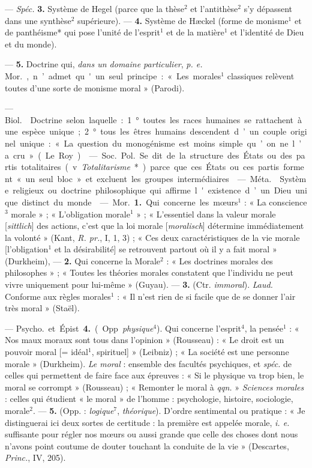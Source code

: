 \begin{itemize}[leftmargin=1cm, label=, itemsep=1pt]
— {\it Spéc.} {\bf 3.} Système de Hegel (parce que la thèse$^2$ et
l’antithèse$^2$ s'y dépassent dans une synthèse$^2$ supérieure). — {\bf 4.}
Système de Hæckel (forme de monisme$^1$ et de panthéisme* qui pose l’unité de
l'esprit$^1$ et de la matière$^1$ et l'identité de Dieu et du monde).

— {\bf 5.} Doctrine qui, {\it dans un domaine particulier}, {\it p. e.}
\si{Mor.}, n’admet qu'un seul principe : « Les morales$^1$ classiques
relèvent toutes d’une sorte de monisme moral » (Parodi).

 — \si{Biol.}  Doctrine selon laquelle : 1°
toutes les races humaines se rattachent à une espèce unique; 2° tous les
êtres humains descendent d’un couple originel unique : « La question du
monogénisme est moins simple qu’on ne l’a cru » (Le Roy).

 — \si{Soc.} \si{Pol.} Se dit de la structure des États ou
des partis totalitaires (v. {\it Totalitarisme}*) parce que ces États ou ces
partis forment « un seul bloc » et excluent les groupes intermédiaires.

 — \si{Méta.}  Système religieux ou doctrine
philosophique qui affirme l'existence d’un Dieu unique distinct du monde.

 — \si{Mor.} {\bf 1.} Qui concerne les mœurs$^1$ : « La
conscience$^3$ morale » ;
« L'obligation morale$^1$ » ; « L’essentiel dans la valeur morale
[{\it sittlich}] des actions, c’est que la loi morale [{\it moralisch}]
détermine immédiatement la volonté » (Kant, {\it R. pr.}, I, 1, 3) ; « Ces
deux caractéristiques de la vie morale [l’obligation$^1$ et la désirabilité]
se retrouvent partout où il y a fait moral » (Durkheim), — {\bf 2.} Qui
concerne la Morale$^2$ : « Les doctrines morales des philosophes » ; « Toutes
les théories morales constatent que l'individu ne peut vivre uniquement pour
lui-même » (Guyau). — {\bf 3.} (Ctr. {\it immoral}). {\it Laud.} Conforme aux
règles morales$^1$ : « Il n’est rien de si facile que de se donner l'air très
moral » (Staël).

— \si{Psycho.} et Épist. {\bf 4.} (Opp. {\it physique}$^4$). Qui concerne
l’esprit$^4$, la pensée$^1$ : « Nos maux moraux sont tous dans
l'opinion » (Rousseau) : « Le droit est un pouvoir moral [= idéal$^1$,
spirituel] » (Leibniz) ; « La société est une personne morale » (Durkheim).
{\it Le moral} : ensemble des facultés psychiques, et {\it spéc.} de celles
qui permettent de faire face aux épreuves : « Si le physique va trop bien, le
moral se corrompt » (Rousseau) ; « Remonter le moral à {\it qqn.} »
{\it Sciences morales} : celles qui étudient « le moral » de l’homme :
psychologie, histoire, sociologie, morale$^2$. — {\bf 5.} (Opp. :
{\it logique}$^7$, {\it théorique}). D'ordre sentimental ou pratique : « Je
distinguerai ici deux sortes de certitude : la première est appelée morale,
{\it i. e.} suffisante pour régler nos mœurs ou aussi grande que celle des
choses dont nous n'avons point coutume de douter touchant la conduite de la
vie » (Descartes, {\it Princ.}, IV, 205).


\end{itemize}

